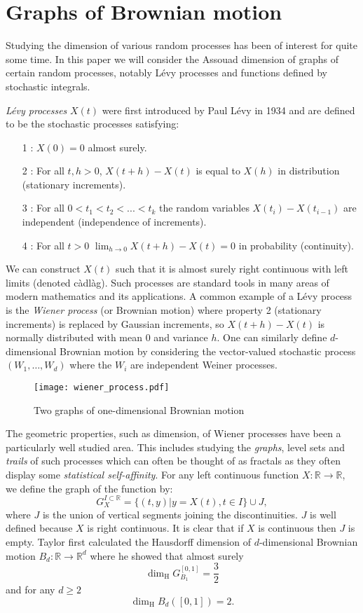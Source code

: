 \chapter{Graphs of Brownian motion}
\label{chap:graphs}



Studying the dimension of various random processes has been of interest for quite some time. In this paper we will consider the Assouad dimension of graphs of certain random processes, notably L\'evy processes and functions defined by stochastic integrals. 

\emph{L\'{e}vy processes} $X(t)$ were first introduced by Paul L\'evy in 1934 \cite{Le} and are defined to be the stochastic processes satisfying:
\begin{itemize}
	\item[1]: $X(0)=0$ almost surely.
	\item[2]: For all $t,h>0$, $X(t+h)-X(t)$ is equal to $X(h)$ in distribution (stationary increments).
	\item[3]: For all $0<t_1<t_2<...<t_k$ the random variables $X(t_i)-X(t_{i-1})$ are independent (independence of increments).
	\item[4]: For all $t>0$ $\lim_{h\to 0} X(t+h)-X(t)=0$ in probability (continuity).
\end{itemize}
We can construct $X(t)$ such that it is almost surely right continuous with left limits (denoted c\`adl\`ag). Such processes are standard tools in many areas of modern mathematics and its applications. A common example of a L\'evy process is the \emph{Wiener process} (or Brownian motion) where property 2 (stationary increments) is replaced by Gaussian increments, so $X(t+h)-X(t)$ is normally distributed with mean 0 and variance $h$. One can similarly define $d$-dimensional Brownian motion by considering the vector-valued stochastic process $(W_1,\ldots, W_d)$ where the $W_i$ are independent Weiner processes. 

\begin{figure}[h]
	\texttt{[image: wiener\_process.pdf]}
	\caption{\label{fig:brownianmotion}Two graphs of one-dimensional Brownian motion}
\end{figure}

The geometric properties, such as dimension, of Wiener processes have been a particularly well studied area. This includes studying the \emph{graphs}, level sets and \emph{trails} of such processes which can often be thought of as fractals as they often display some \emph{statistical self-affinity}. For any left continuous function $X:\mathbb{R}\to\mathbb{R}$, we define the graph of the function by:
\[
G^{I\subset\mathbb{R}}_{X}=\{(t,y)|y=X(t),t\in I\}\cup J,
\]
where $J$ is the union of vertical segments joining the discontinuities. $J$ is well defined because $X$ is right continuous. It is clear that if $X$ is continuous then $J$ is empty. Taylor \cite{Ta} first calculated the Hausdorff dimension of $d$-dimensional Brownian motion $B_d:\mathbb{R}\to\mathbb{R}^d$ where he showed that almost surely
\[
\dim_\text{H} G_{B_1}^{[0,1]} =  \frac{3}{2}         
\]
and for any $d\ge 2$
\[
\dim_\text{H} B_d([0,1]) =  2.
\]

